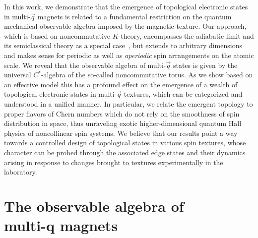 \documentclass[
    10pt,
    aps,
    prb,
	longbibliography,
    twocolumn,
    floatfix,
    superscriptaddress,
]{revtex4-2}
\begin{document}
In this work, we demonstrate that the emergence of topological electronic states in multi-$\vec{q}$ magnets is related to a fundamental restriction on the quantum mechanical observable algebra imposed by the magnetic texture. 
Our approach, which is based on noncommutative $K$-theory, encompasses the adiabatic limit and its semiclassical theory as a special case~\cite{Su2020}, but extends 
to arbitrary dimensions and makes sense for periodic as well as {\it aperiodic} spin arrangements on the atomic scale.
We reveal that the observable algebra of multi-$\vec{q}$ states is given by the universal $C^\ast$-algebra of the so-called noncommutative torus. 
As we show based on an effective model this has a profound effect on the emergence of a wealth of topological electronic states in multi-$\vec{q}$ textures, which can be categorized and understood in a unified manner. 
In particular, we relate the emergent topology to proper flavors of Chern numbers which do not rely on the smoothness of spin distribution in space, thus unraveling exotic higher-dimensional quantum Hall physics of noncollinear spin systems.
We believe that our results point a way towards a controlled design of topological states in various spin textures, whose character can be probed through the associated edge states and their dynamics arising in response to changes brought to textures experimentally in the laboratory. 



\section{\texorpdfstring{The observable algebra of \\ multi-q magnets}{The observable algebra of multi-q magnets}}
\end{document}
